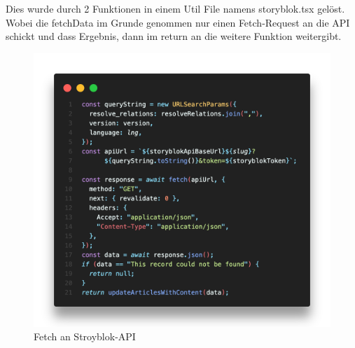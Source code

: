 Dies wurde durch 2 Funktionen in einem Util File namens storyblok.tsx gelöst. Wobei die fetchData im Grunde genommen nur einen Fetch-Request an die API schickt und dass Ergebnis, dann im return an die weitere Funktion weitergibt.
\begin{figure}[H]
    \centering
    \includegraphics[width=\linewidth]{pics/sb-fetch-01.png}
    \caption{Fetch an Stroyblok-API}
\end{figure}

